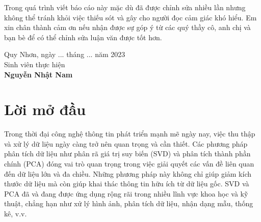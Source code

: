 \documentclass[12pt,a4paper,oneside]{report}
\numberwithin{equation}{section}
\begin{document}
{\begin{justify}
Trong quá trình viết báo cáo này mặc dù đã được chỉnh sửa nhiều lần nhưng không thể tránh khỏi việc thiếu sót và gây cho người đọc cảm giác khó hiểu. Em xin chân thành cảm ơn nếu nhận được sự góp ý từ các quý thầy cô, anh chị và bạn bè để có thể chỉnh sửa luận văn được tốt hơn.
\end{justify}
\vskip 0.5cm
\begin{flushright}
Quy Nhơn, ngày ... tháng ... năm 2023\qquad\\
Sinh viên thực hiện\qquad\qquad\qquad\qquad\\

\vskip 1.5cm
\textbf{Nguyễn Nhật Nam}\qquad\quad\quad\quad\qquad
\end{flushright}

\tableofcontents

\chapter*{Lời mở đầu}

\begin{justify}   
Trong thời đại công nghệ thông tin phát triển mạnh mẽ ngày nay, việc thu thập và xử lý dữ liệu ngày càng trở nên quan trọng và cần thiết. Các phương pháp phân tích dữ liệu như phân rã giá trị suy biến (SVD) và phân tích thành phần chính (PCA) đóng vai trò quan trọng trong việc giải quyết các vấn đề liên quan đến dữ liệu lớn và đa chiều. Những phương pháp này không chỉ giúp giảm kích thước dữ liệu mà còn giúp khai thác thông tin hữu ích từ dữ liệu gốc. SVD và PCA đã và đang được ứng dụng rộng rãi trong nhiều lĩnh vực khoa học và kỹ thuật, chẳng hạn như xử lý hình ảnh, phân tích dữ liệu, nhận dạng mẫu, thống kê, v.v.


\end{justify}}
\end{document}
